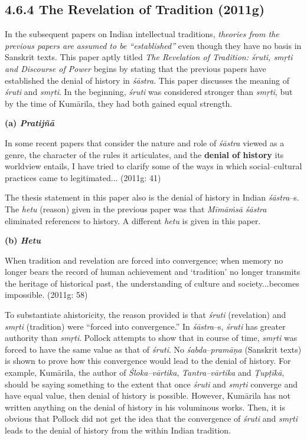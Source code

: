 \subsection*{4.6.4 The Revelation of Tradition (2011g)}

In the subsequent papers on Indian intellectual traditions, \textit{theories from the previous papers are assumed to be “established”} even though they have no basis in Sanskrit texts. This paper aptly titled \textit{The Revelation of Tradition: śruti, smṛti and Discourse of Power} begins by stating that the previous papers have established the denial of history in \textit{śāstra}. This paper discusses the meaning of \textit{śruti} and \textit{smṛti}. In the beginning, \textit{śruti} was considered stronger than \textit{smṛti}, but by the time of Kumārila, they had both gained equal strength.

\textbf{(a) \textit{Pratijñā}}

\begin{myquote}
In some recent papers that consider the nature and role of \textit{śāstra }viewed as a genre, the character of the rules it articulates, and the \textbf{denial of history} its worldview entails, I have tried to clarify some of the ways in which social–cultural practices came to legitimated... (2011g: 41)
\end{myquote}

The thesis statement in this paper also is the denial of history in Indian \textit{śāstra}–s. The \textit{hetu} (reason) given in the previous paper was that \textit{Mīmāṁsā śāstra} eliminated references to history. A different \textit{hetu} is given in this paper.

\textbf{(b) \textit{Hetu}}

\begin{myquote}
When tradition and revelation are forced into convergence; when memory no longer bears the record of human achievement and ‘tradition’ no longer transmits the heritage of historical past, the understanding of culture and society...becomes impossible. (2011g: 58)
\end{myquote}

To substantiate ahistoricity, the reason provided is that \textit{śruti }(revelation) and \textit{smṛti} (tradition) were “forced into convergence.” In \textit{śāstra}–s, \textit{śruti} has greater authority than \textit{smṛti}. Pollock attempts to show that in course of time, \textit{smṛti }was forced to have the same value as that of\textit{ śruti}. No \textit{śabda}–\textit{pramāṇa} (Sanskrit texts) is shown to prove how this convergence would lead to the denial of history. For example, Kumārila, the author of \textit{Śloka–vārtika}, \textit{Tantra–vārtika} and \textit{Ṭupṭīkā}, should be saying something to the extent that once \textit{śruti} and \textit{smṛti }converge and have equal value, then denial of history is possible. However, Kumārila has not written anything on the denial of history in his voluminous works. Then, it is obvious that Pollock did not get the idea that the convergence of \textit{śruti} and \textit{smṛti} leads to the denial of history from the within Indian tradition.

